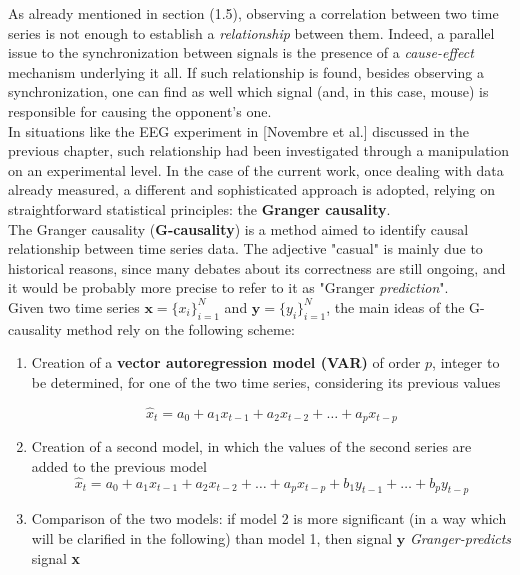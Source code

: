 \documentclass[a4paper]{article}
\begin{document}
As already mentioned in section (1.5), observing a correlation between two time series 
is not enough to establish a \textit{relationship} between them. Indeed, a parallel issue to the synchronization between signals is the presence of a \textit{cause-effect} mechanism underlying it all. If such relationship is found, besides observing a synchronization, one can find as well which signal (and, in this case, mouse) is responsible for causing the opponent's one.\\
In situations like the EEG experiment in [Novembre et al.] discussed in the previous chapter, such relationship had been investigated through a manipulation on an experimental level. In the case of the current work, once dealing with data already measured, a different and sophisticated approach is adopted, relying on straightforward statistical principles: the \textbf{Granger causality}.\\
The Granger causality (\textbf{G-causality}) is a method aimed to identify causal relationship between time series data. The adjective "casual" is mainly due to historical reasons, since many debates about its correctness are still ongoing, and it would be probably more precise to refer to it as "Granger \textit{prediction}".
\\

Given two time series $ \textbf{x} = \{x_i\}_{i=1}^N$ and  $\textbf{y} = \{y_i\}_{i=1}^N$, the main ideas of the G-causality method rely on the following scheme:

\begin{enumerate}
	
	\item Creation of a \textbf{vector autoregression model (VAR)} of order $p$, integer to be determined, for one of the two time series, considering its previous values
	
	\begin{equation}
		\hat{x}_t = a_0 + a_1 x_{t-1} + a_2 x_{t-2} + \dots + a_p x_{t-p}
	\end{equation}
	
	
	\item Creation of a second model, in which the values of the second series are added  to the previous model 
	\begin{equation}
		\hat{x}_t = a_0 + a_1 x_{t-1} + a_2 x_{t-2} + \dots + a_p x_{t-p} + b_1 y_{t-1} + \dots + b_p y_{t-p}
	\end{equation}

	
	\item Comparison of the two models: if model 2 is more significant (in a way which will be clarified in the following) than model 1, then signal $\textbf{y}$ \textit{Granger-predicts} signal \textbf{x} 

\end{enumerate}
\end{document}
